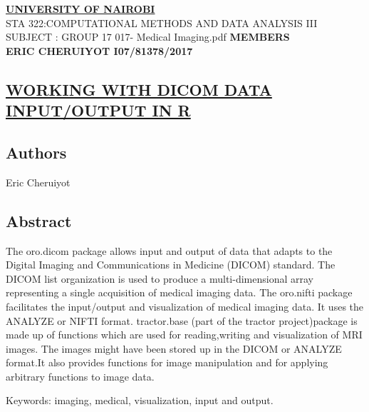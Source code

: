 \documentclass[10pt]{article}\usepackage[]{graphicx}\usepackage[]{color}
\begin{document}
\begin{titlepage}
\begin{center}
\vspace*{1cm}
\Huge{\textbf{\ul{ UNIVERSITY  OF  NAIROBI}}}\\
\vfill
STA 322:COMPUTATIONAL METHODS AND DATA ANALYSIS III
\vfill
SUBJECT : GROUP 17 
 \vfill
017- Medical Imaging.pdf
\vfill
\Large{\textbf{MEMBERS}}\\

\Large{\textbf{ERIC CHERUIYOT I07/81378/2017}}\\
\vfill
\end{center}
\end{titlepage}
\begin{center}
\section*{\Large{\textbf{\ul{WORKING WITH DICOM DATA INPUT/OUTPUT IN R}}}}
\end{center}

\subsection*{\textbf{Authors}}
Eric Cheruiyot
\subsection*{Abstract}

The oro.dicom package allows input and output of data that adapts to the Digital
Imaging and Communications in Medicine (DICOM) standard. The DICOM list
organization is used to produce a multi-dimensional array representing a single
acquisition of medical imaging data. The oro.nifti package facilitates the input/output
and visualization of medical imaging data. It uses the ANALYZE or NIFTI format.
tractor.base (part of the tractor project)package is made up of functions which are
used for reading,writing and visualization of MRI images. The images might have
been stored up in the DICOM or ANALYZE format.It also provides functions for
image manipulation and for applying arbitrary functions to image data.


Keywords: imaging, medical, visualization, input and output.
\end{document}
